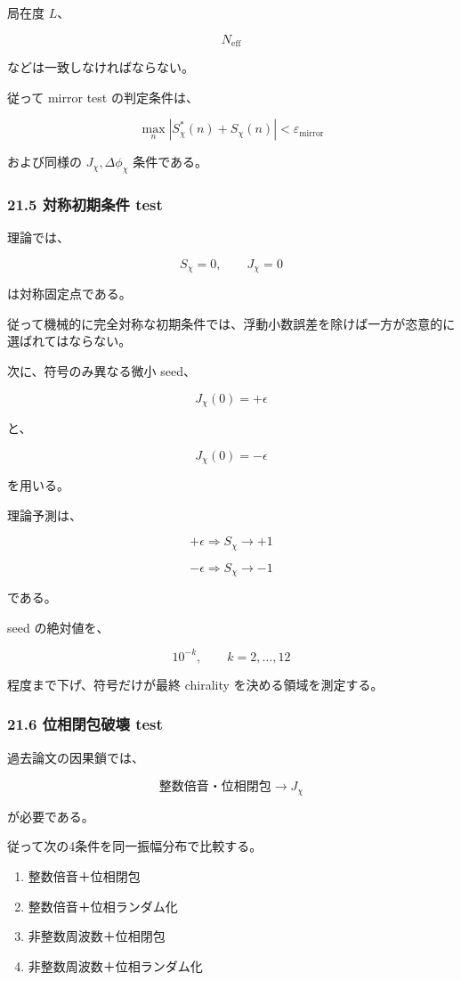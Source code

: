 \documentclass[
  a4paper,
]{ltjsarticle}
\providecommand{\tightlist}{%
  \setlength{\itemsep}{0pt}\setlength{\parskip}{0pt}}
\begin{document}
局在度 \(L\)、

\[
N_{\mathrm{eff}}
\]

などは一致しなければならない。

従って mirror test の判定条件は、

\[
\boxed{
\max_n
|S_\chi^*(n)+S_\chi(n)|
<
\varepsilon_{\mathrm{mirror}}
}
\tag{185}
\]

および同様の \(J_\chi,\Delta\phi_\chi\) 条件である。

\subsubsection{21.5 対称初期条件
test}\label{ux5bfeux79f0ux521dux671fux6761ux4ef6-test}

理論では、

\[
S_\chi=0,
\qquad
J_\chi=0
\]

は対称固定点である。

従って機械的に完全対称な初期条件では、浮動小数誤差を除けば一方が恣意的に選ばれてはならない。

次に、符号のみ異なる微小 seed、

\[
J_\chi(0)=+\epsilon
\]

と、

\[
J_\chi(0)=-\epsilon
\]

を用いる。

理論予測は、

\[
\boxed{
+\epsilon
\Longrightarrow
S_\chi\to+1
}
\tag{186}
\]

\[
\boxed{
-\epsilon
\Longrightarrow
S_\chi\to-1
}
\tag{187}
\]

である。

seed の絶対値を、

\[
10^{-k},
\qquad
k=2,\ldots,12
\]

程度まで下げ、符号だけが最終 chirality を決める領域を測定する。

\subsubsection{21.6 位相閉包破壊
test}\label{ux4f4dux76f8ux9589ux5305ux7834ux58ca-test}

過去論文の因果鎖では、

\[
\text{整数倍音・位相閉包}
\to
J_\chi
\]

が必要である。

従って次の4条件を同一振幅分布で比較する。

\begin{enumerate}
\def\labelenumi{\arabic{enumi}.}
\tightlist
\item
  整数倍音＋位相閉包
\item
  整数倍音＋位相ランダム化
\item
  非整数周波数＋位相閉包
\item
  非整数周波数＋位相ランダム化
\end{enumerate}
\end{document}
